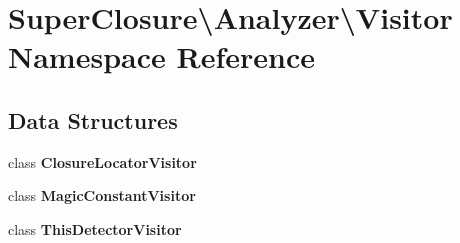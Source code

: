 \section{Super\+Closure\textbackslash{}Analyzer\textbackslash{}Visitor Namespace Reference}
\label{namespace_super_closure_1_1_analyzer_1_1_visitor}
\subsection*{Data Structures}
\begin{DoxyCompactItemize}
\item 
class {\bf Closure\+Locator\+Visitor}
\item 
class {\bf Magic\+Constant\+Visitor}
\item 
class {\bf This\+Detector\+Visitor}
\end{DoxyCompactItemize}
